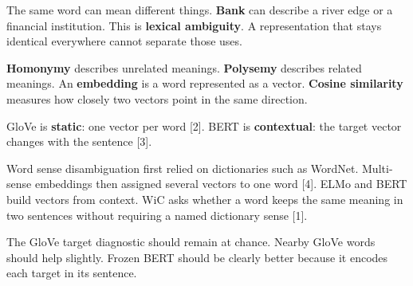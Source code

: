 \documentclass{article}
\begin{document}
\bodyfont
{}

\noindent
\begin{minipage}[t][390mm][s]{0.485\textwidth}\vspace{0pt}\RaggedRight
{}
The same word can mean different things. \textbf{Bank} can describe a river edge or a financial institution. This is \textbf{lexical ambiguity}. A representation that stays identical everywhere cannot separate those uses.

\vfill
{}
\textbf{Homonymy} describes unrelated meanings. \textbf{Polysemy} describes related meanings. An \textbf{embedding} is a word represented as a vector. \textbf{Cosine similarity} measures how closely two vectors point in the same direction.

GloVe is \textbf{static}: one vector per word [2]. BERT is \textbf{contextual}: the target vector changes with the sentence [3].

\vfill
{}
Word sense disambiguation first relied on dictionaries such as WordNet. Multi-sense embeddings then assigned several vectors to one word [4]. ELMo and BERT build vectors from context. WiC asks whether a word keeps the same meaning in two sentences without requiring a named dictionary sense [1].

\vfill
{}
The GloVe target diagnostic should remain at chance. Nearby GloVe words should help slightly. Frozen BERT should be clearly better because it encodes each target in its sentence.
\end{minipage}\hfill
\end{document}
